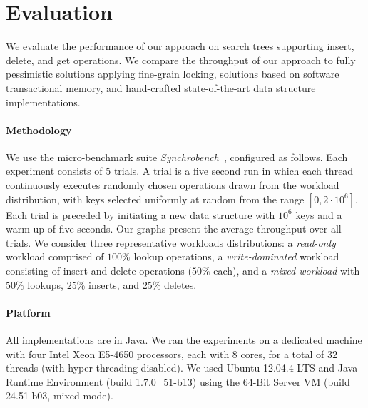 \section{Evaluation}
\label{sec:eval}

We evaluate the performance of our approach on 
search trees supporting insert, delete, and get operations. 
We compare the throughput of our approach to fully pessimistic solutions applying fine-grain locking, solutions based on software transactional memory, and hand-crafted state-of-the-art data structure
implementations.

\paragraph{Methodology} We use the micro-benchmark suite \textit{Synchrobench}~\cite{Gramoli2015}, configured as follows. 
Each experiment
consists of $5$ trials. A trial is a five second run in which each thread continuously executes
randomly chosen operations drawn from the workload distribution, with keys
selected uniformly at random from the range $[0,2\cdot10^6]$.
Each trial is preceded by initiating a new data structure with
$10^6$ keys and a warm-up of five seconds.  Our graphs present the average throughput over all trials.
We consider three representative workloads distributions: a
\emph{read-only} workload comprised of $100\%$ lookup operations, a \emph{write-dominated}
workload consisting of insert and delete operations ($50\%$ each), and a
\emph{mixed workload} with $50\%$ lookups, $25\%$ inserts, and $25\%$
deletes.


\paragraph{Platform} All implementations are in Java. We ran the experiments on a dedicated machine with
four Intel Xeon E5-4650 processors, each with $8$ cores, for a total of $32$ threads
(with hyper-threading disabled).
We used Ubuntu 12.04.4 LTS and Java Runtime Environment (build
1.7.0\_51-b13) using the 64-Bit Server VM (build 24.51-b03, mixed mode).

